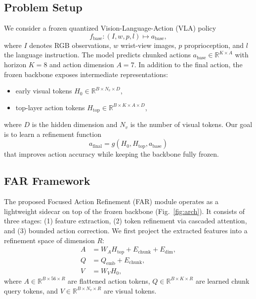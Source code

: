 \documentclass[conference]{IEEEtran}
\begin{document}
\subsection{Problem Setup}
We consider a frozen quantized Vision-Language-Action (VLA) policy
\begin{equation}
f_{\text{base}} : (I, w, p, l) \mapsto a_{\text{base}},
\end{equation}
where $I$ denotes RGB observations, $w$ wrist-view images, $p$ proprioception, and $l$ the language instruction. The model predicts chunked actions $a_{\text{base}} \in \mathbb{R}^{K \times A}$ with horizon $K=8$ and action dimension $A=7$.
In addition to the final action, the frozen backbone exposes intermediate representations:
\begin{itemize}
    \item early visual tokens $H_0 \in \mathbb{R}^{B \times N_v \times D}$,
    \item top-layer action tokens $H_{\text{top}} \in \mathbb{R}^{B \times K \times A \times D}$,
\end{itemize}
where $D$ is the hidden dimension and $N_v$ is the number of visual tokens.
Our goal is to learn a refinement function
\begin{equation}
a_{\text{final}} = g(H_0, H_{\text{top}}, a_{\text{base}})
\end{equation}
that improves action accuracy while keeping the backbone fully frozen.

\subsection{FAR Framework}
The proposed Focused Action Refinement (FAR) module operates as a lightweight sidecar on top of the frozen backbone (Fig.~\ref{fig:arch}). It consists of three stages: (1) feature extraction, (2) token refinement via cascaded attention, and (3) bounded action correction.
We first project the extracted features into a refinement space of dimension $R$:
\begin{align}
A &= W_A H_{\text{top}} + E_{\text{chunk}} + E_{\text{dim}}, \\
Q &= Q_{\text{emb}} + E_{\text{chunk}}, \\
V &= W_V H_0,
\end{align}
where $A \in \mathbb{R}^{B \times 56 \times R}$ are flattened action tokens, $Q \in \mathbb{R}^{B \times K \times R}$ are learned chunk query tokens, and $V \in \mathbb{R}^{B \times N_v \times R}$ are visual tokens.
\end{document}
